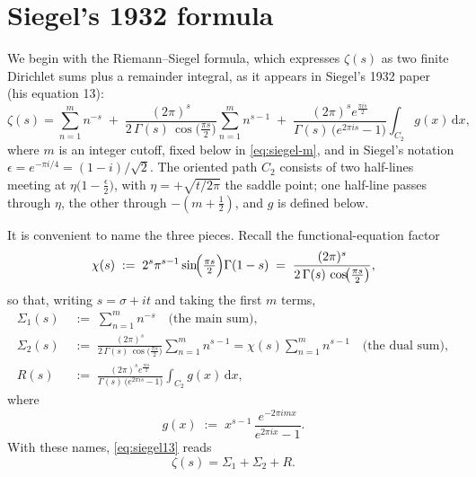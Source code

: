 \documentclass[11pt]{article}
\theoremstyle{definition}
\begin{document}
\section{Siegel's 1932 formula}\label{sec:siegel}

We begin with the Riemann--Siegel formula, which expresses $\zeta(s)$ as two
finite Dirichlet sums plus a remainder integral, as it appears in Siegel's
1932 paper~\cite{Siegel1932} (his equation 13):
\begin{equation}\label{eq:siegel13}
\zeta(s)
=
\sum_{n=1}^{m} n^{-s}
\;+\;
\frac{(2\pi)^s}{2\,\Gamma(s)\,\cos\!\bigl(\tfrac{\pi s}{2}\bigr)}
\sum_{n=1}^{m} n^{s-1}
\;+\;
\frac{(2\pi)^s e^{\tfrac{\pi i s}{2}}}{\Gamma(s)\,\bigl(e^{2\pi i s}-1\bigr)}
\int_{C_2} g(x)\,\mathrm{d}x,
\end{equation}
where $m$ is an integer cutoff, fixed below in \eqref{eq:siegel-m}, and
in Siegel's notation $\epsilon=e^{-\pi i/4}=(1-i)/\sqrt2$. The oriented
path $C_2$ consists of two half-lines meeting at
$\eta\bigl(1-\tfrac{\epsilon}{2}\bigr)$, with
$\eta=+\sqrt{t/2\pi}$ the saddle point; one half-line passes through
$\eta$, the other through $-(m+\tfrac12)$, and $g$ is defined below.

It is convenient to name the three pieces. Recall the functional-equation
factor
\begin{equation}
\chi(s) \;:=\; 2^{s}\pi^{s-1}\sin\!\Bigl(\tfrac{\pi s}{2}\Bigr)\Gamma(1-s)
\;=\;
\frac{(2\pi)^s}{2\,\Gamma(s)\,\cos\!\bigl(\tfrac{\pi s}{2}\bigr)},
\end{equation}
so that, writing $s=\sigma+it$ and taking the first $m$ terms,
\begin{align}
\Sigma_{1}(s) &\;:=\; \sum_{n=1}^{m} n^{-s}
\quad\text{(the main sum)}, \\[2pt]
\Sigma_{2}(s) &\;:=\; \frac{(2\pi)^s}{2\,\Gamma(s)\,\cos\!\bigl(\tfrac{\pi s}{2}\bigr)}
\sum_{n=1}^{m} n^{s-1}
= \chi(s)\sum_{n=1}^{m} n^{s-1}
\quad\text{(the dual sum)}, \\[2pt]
R(s) &\;:=\; \frac{(2\pi)^s e^{\tfrac{\pi i s}{2}}}{\Gamma(s)\,\bigl(e^{2\pi i s}-1\bigr)}
\int_{C_2} g(x)\,\mathrm{d}x,
\end{align}
where
\begin{equation}
g(x)\;:=\;x^{s-1}\,\frac{e^{-2\pi i m x}}{e^{2\pi i x}-1}.
\end{equation}
With these names, \eqref{eq:siegel13} reads
\begin{equation}\label{eq:siegel-named}
\zeta(s) = \Sigma_{1} + \Sigma_{2} + R.
\end{equation}
\end{document}
